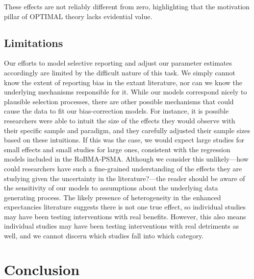 \documentclass[
  man, donotrepeattitle,mask,floatsintext]{apa7}
\begin{document}
These effects are not reliably different from zero, highlighting that the motivation pillar of OPTIMAL theory lacks evidential value.

\hypertarget{limitations}{%
\subsection{Limitations}\label{limitations}}

Our efforts to model selective reporting and adjust our parameter estimates accordingly are limited by the difficult nature of this task. We simply cannot know the extent of reporting bias in the extant literature, nor can we know the underlying mechanisms responsible for it. While our models correspond nicely to plausible selection processes, there are other possible mechanisms that could cause the data to fit our bias-correction models. For instance, it is possible researchers were able to intuit the size of the effects they would observe with their specific sample and paradigm, and they carefully adjusted their sample sizes based on these intuitions. If this was the case, we would expect large studies for small effects and small studies for large ones, consistent with the regression models included in the RoBMA-PSMA. Although we consider this unlikely---how could researchers have such a fine-grained understanding of the effects they are studying given the uncertainty in the literature?---the reader should be aware of the sensitivity of our models to assumptions about the underlying data generating process. The likely presence of heterogeneity in the enhanced expectancies literature suggests there is not one true effect, so individual studies may have been testing interventions with real benefits. However, this also means individual studies may have been testing interventions with real detriments as well, and we cannot discern which studies fall into which category.

\hypertarget{conclusion}{%
\section{Conclusion}\label{conclusion}}
\end{document}
